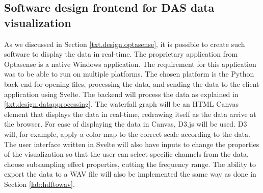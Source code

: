 






\subsection{Software design frontend for DAS data visualization}\label{txt.design.frontend.dataviz}

As we discussed in Section \ref{txt.design.optasense}, it is possible to create such software to display the data in real-time. The proprietary application from Optasense is a native Windows application. The requirement for this application was to be able to run on multiple platforms. The chosen platform is the Python back-end for opening files, processing the data, and sending the data to the client application using Svelte. The backend will process the data as explained in \ref{txt.design.datapprocessing}. The waterfall graph will be an HTML Canvas element that displays the data in real-time, redrawing itself as the data arrive at the browser. For ease of displaying the data in Canvas, D3.js will be used. D3 will, for example, apply a color map to the correct scale according to the data. The user interface written in Svelte will also have inputs to change the properties of the visualization so that the user can select specific channels from the data, choose subsampling effect properties, cutting the frequency range. The ability to export the data to a WAV file will also be implemented the same way as done in Section \ref{lab:hdftowav}.

